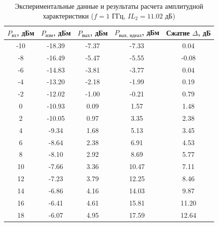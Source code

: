 \begin{table}[H]
\centering
\caption{Экспериментальные данные и результаты расчета амплитудной характеристики ($f = 1\text{ ГГц}$, $IL_2 = 11.02\text{ дБ}$)}
\label{tab:p1db_1ghz}
\small
\begin{tabular}{|c|c|c|c|c|}
\hline
$P_{\text{вх}}$, дБм & $P_{\text{изм}}$, дБм & $P_{\text{вых}}$, дБм & $P_{\text{вых, идеал}}$, дБм & Сжатие $\Delta$, дБ \\
\hline
-10 & -18.39 & -7.37 & -7.33 & 0.04 \\
-8  & -16.49 & -5.47 & -5.55 & -0.08 \\
-6  & -14.83 & -3.81 & -3.77 & 0.04 \\
-4  & -13.20 & -2.18 & -1.99 & 0.19 \\
-2  & -12.02 & -1.00 & -0.21 & 0.79 \\
0   & -10.93 &  0.09 &  1.57 & 1.48 \\
2   & -10.05 &  0.97 &  3.35 & 2.38 \\
4   & -9.34  &  1.68 &  5.13 & 3.45 \\
6   & -8.64  &  2.38 &  6.91 & 4.53 \\
8   & -8.10  &  2.92 &  8.69 & 5.77 \\
10  & -7.66  &  3.36 & 10.47 & 7.11 \\
12  & -7.23  &  3.79 & 12.25 & 8.46 \\
14  & -6.86  &  4.16 & 14.03 & 9.87 \\
16  & -6.41  &  4.61 & 15.81 & 11.20 \\
18  & -6.07  &  4.95 & 17.59 & 12.64 \\
\hline
\end{tabular}
\end{table}

